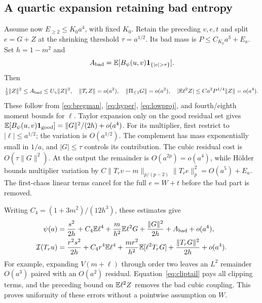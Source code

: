 \subsection{A quartic expansion retaining bad entropy}
Assume now $E_{\ge2}\le K_0a^4$, with fixed $K_0$.
Retain the preceding $v,e,t$ and split $e=G+Z$ at the shrinking threshold
$\tau=a^{1/2}$. Its bad mass is $P\le C_{K_0}a^3+E_a$.
Set $h=1-m^2$ and
\[
 A_{\rm bad}=\E[B_\psi(u,v)\mathbf1_{\{|e|>\tau\}}].
\]
Then
\[
 \tfrac12\|Z\|^2\le A_{\rm bad}\le U_\gamma\|Z\|^2,
 \quad \|T_rZ\|=o(a^2),\quad \|\Pi_{\le1}G\|=o(a^2),
 \quad |\mathbb E\ell^2Z|\le Ca^2P^{1/4}\|Z\|=o(a^4).
\]
These follow from \eqref{eq:bregman}, \eqref{eq:hyper},
\eqref{eq:lowproj}, and fourth/eighth moment bounds for $\ell$.
Taylor expansion only on the good residual set gives
$\mathbb E[B_\psi(u,v)\mathbf1_{\rm good}]=\|G\|^2/(2h)+o(a^4)$.
For its multiplier, first restrict to $|\ell|\le a^{1/2}$; the variation
is $O(a^{1/2})$. The complement has mass exponentially small in $1/a$,
and $|G|\le\tau$ controls its contribution. The cubic residual cost
is $O(\tau\|G\|^2)$.
At the output the remainder is $O(a^{2p})=o(a^4)$, while H\"older
bounds multiplier variation by
$C\|T_rv-m\|_{p/(p-2)}\|T_re\|_p^2=O(a^5)+E_a$.
The first-chaos linear terms cancel for the full $e=W+t$ before the
bad part is removed.

Writing $C_4=(1+3m^2)/(12h^3)$, these estimates give
\begin{align}
 \psi(a)&=\frac{s^2}{2h}+C_4\mathbb E\ell^4+\frac m{h^2}\mathbb E\ell^2G
       +\frac{\|G\|^2}{2h}+A_{\rm bad}+o(a^4),\label{eq:quarticin}\\
 \mathcal I(T_ru)&=\frac{r^2s^2}{2h}+C_4r^4\mathbb E\ell^4
       +\frac{mr^2}{h^2}\mathbb E[\ell^2T_rG]
       +\frac{\|T_rG\|^2}{2h}+o(a^4).\label{eq:quarticout}
\end{align}
For example, expanding $V(m+\ell)$ through order two leaves an
$L^2$ remainder $O(a^3)$ paired with an $O(a^2)$ residual.
Equation~\eqref{eq:cliptail} pays all clipping terms, and the preceding
bound on $\mathbb E\ell^2Z$ removes the bad cubic coupling. This proves
uniformity of these errors without a pointwise assumption on $W$.

